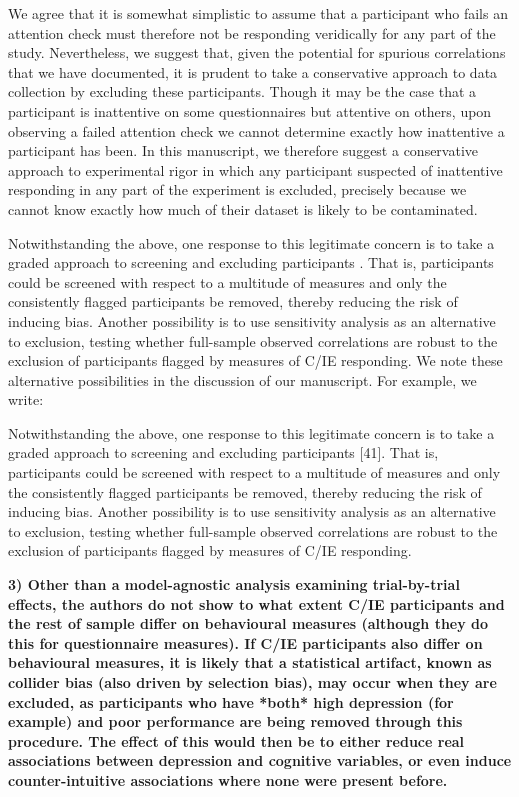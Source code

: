 \documentclass[a4paper,notitlepage,12pt]{article}
\begin{document}
We agree that it is somewhat simplistic to assume that a participant who fails an attention check must therefore not be responding veridically for any part of the study. Nevertheless, we suggest that, given the potential for spurious correlations that we have documented, it is prudent to take a conservative approach to data collection by excluding these participants. Though it may be the case that a participant is inattentive on some questionnaires but attentive on others, upon observing a failed attention check we cannot determine exactly how inattentive a participant has been. In this manuscript, we therefore suggest  a conservative approach to experimental rigor in which any participant suspected of inattentive responding in any part of the experiment is excluded, precisely because we cannot know exactly how much of their dataset is likely to be contaminated.

Notwithstanding the above, one response to this legitimate concern is to take a graded approach to screening and excluding participants \cite{Kim2018-ev}. That is, participants could be screened with respect to a multitude of measures and only the consistently flagged participants be removed, thereby reducing the risk of inducing bias. Another possibility is to use sensitivity analysis as an alternative to exclusion, testing whether full-sample observed correlations are robust to the exclusion of participants flagged by measures of C/IE responding. We note these alternative possibilities in the discussion of our manuscript. For example, we write:

\begin{displayquote}
Notwithstanding the above, one response to this legitimate concern is to take a graded approach to screening and excluding participants [41]. That is, participants could be screened with respect to a multitude of measures and only the consistently flagged participants be removed, thereby reducing the risk of inducing bias. Another possibility is to use sensitivity analysis as an alternative to exclusion, testing whether full-sample observed correlations are robust to the exclusion of participants flagged by measures of C/IE responding.
\end{displayquote}

\textbf{3) Other than a model-agnostic analysis examining trial-by-trial effects, the authors do not show to what extent C/IE participants and the rest of sample differ on behavioural measures (although they do this for questionnaire measures). If C/IE participants also differ on behavioural measures, it is likely that a statistical artifact, known as collider bias (also driven by selection bias), may occur when they are excluded, as participants who have *both* high depression (for example) and poor performance are being removed through this procedure. The effect of this would then be to either reduce real associations between depression and cognitive variables, or even induce counter-intuitive associations where none were present before.}
\end{document}
